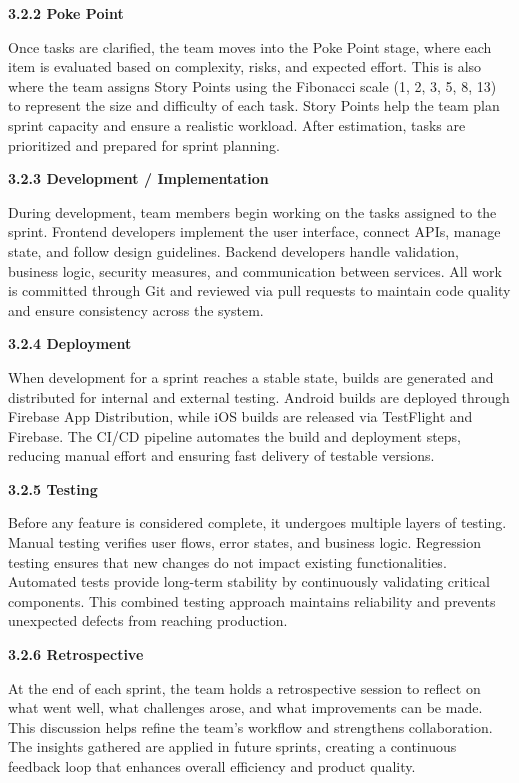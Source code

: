 \textbf{3.2.2 Poke Point}

Once tasks are clarified, the team moves into the Poke Point stage,
where each item is evaluated based on complexity, risks, and expected
effort. This is also where the team assigns Story Points using the
Fibonacci scale (1, 2, 3, 5, 8, 13) to represent the size and difficulty
of each task. Story Points help the team plan sprint capacity and ensure
a realistic workload. After estimation, tasks are prioritized and
prepared for sprint planning.

\textbf{3.2.3 Development / Implementation}

During development, team members begin working on the tasks assigned to
the sprint. Frontend developers implement the user interface, connect
APIs, manage state, and follow design guidelines. Backend developers
handle validation, business logic, security measures, and communication
between services. All work is committed through Git and reviewed via
pull requests to maintain code quality and ensure consistency across the
system.

\textbf{3.2.4 Deployment}

When development for a sprint reaches a stable state, builds are
generated and distributed for internal and external testing. Android
builds are deployed through Firebase App Distribution, while iOS builds
are released via TestFlight and Firebase. The CI/CD pipeline automates
the build and deployment steps, reducing manual effort and ensuring fast
delivery of testable versions.

\textbf{3.2.5 Testing}

Before any feature is considered complete, it undergoes multiple layers
of testing. Manual testing verifies user flows, error states, and
business logic. Regression testing ensures that new changes do not
impact existing functionalities. Automated tests provide long-term
stability by continuously validating critical components. This combined
testing approach maintains reliability and prevents unexpected defects
from reaching production.

\textbf{3.2.6 Retrospective}

At the end of each sprint, the team holds a retrospective session to
reflect on what went well, what challenges arose, and what improvements
can be made. This discussion helps refine the team's workflow and
strengthens collaboration. The insights gathered are applied in future
sprints, creating a continuous feedback loop that enhances overall
efficiency and product quality.

